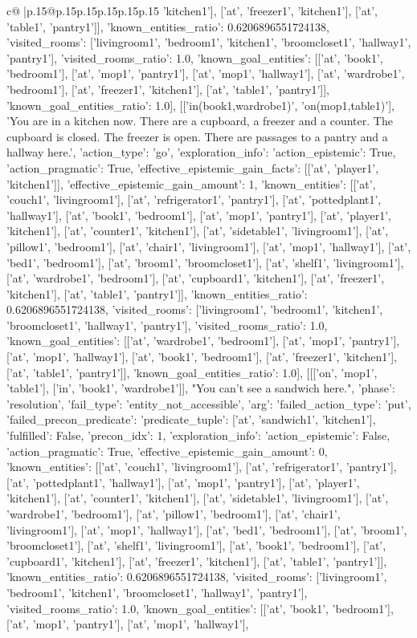 \documentclass{article}
\begin{document}
{\begin{supertabular}{c@{$\;$}|p{.15\linewidth}@{}p{.15\linewidth}p{.15\linewidth}p{.15\linewidth}p{.15\linewidth}p{.15\linewidth}}
{{{'kitchen1'], ['at', 'freezer1', 'kitchen1'], ['at', 'table1', 'pantry1']], 'known_entities_ratio': 0.6206896551724138, 'visited_rooms': ['livingroom1', 'bedroom1', 'kitchen1', 'broomcloset1', 'hallway1', 'pantry1'], 'visited_rooms_ratio': 1.0, 'known_goal_entities': [['at', 'book1', 'bedroom1'], ['at', 'mop1', 'pantry1'], ['at', 'mop1', 'hallway1'], ['at', 'wardrobe1', 'bedroom1'], ['at', 'freezer1', 'kitchen1'], ['at', 'table1', 'pantry1']], 'known_goal_entities_ratio': 1.0}}], [['in(book1,wardrobe1)', 'on(mop1,table1)'], 'You are in a kitchen now. There are a cupboard, a freezer and a counter. The cupboard is closed. The freezer is open. There are passages to a pantry and a hallway here.', {'action_type': 'go', 'exploration_info': {'action_epistemic': True, 'action_pragmatic': True, 'effective_epistemic_gain_facts': [['at', 'player1', 'kitchen1']], 'effective_epistemic_gain_amount': 1, 'known_entities': [['at', 'couch1', 'livingroom1'], ['at', 'refrigerator1', 'pantry1'], ['at', 'pottedplant1', 'hallway1'], ['at', 'book1', 'bedroom1'], ['at', 'mop1', 'pantry1'], ['at', 'player1', 'kitchen1'], ['at', 'counter1', 'kitchen1'], ['at', 'sidetable1', 'livingroom1'], ['at', 'pillow1', 'bedroom1'], ['at', 'chair1', 'livingroom1'], ['at', 'mop1', 'hallway1'], ['at', 'bed1', 'bedroom1'], ['at', 'broom1', 'broomcloset1'], ['at', 'shelf1', 'livingroom1'], ['at', 'wardrobe1', 'bedroom1'], ['at', 'cupboard1', 'kitchen1'], ['at', 'freezer1', 'kitchen1'], ['at', 'table1', 'pantry1']], 'known_entities_ratio': 0.6206896551724138, 'visited_rooms': ['livingroom1', 'bedroom1', 'kitchen1', 'broomcloset1', 'hallway1', 'pantry1'], 'visited_rooms_ratio': 1.0, 'known_goal_entities': [['at', 'wardrobe1', 'bedroom1'], ['at', 'mop1', 'pantry1'], ['at', 'mop1', 'hallway1'], ['at', 'book1', 'bedroom1'], ['at', 'freezer1', 'kitchen1'], ['at', 'table1', 'pantry1']], 'known_goal_entities_ratio': 1.0}}], [[['on', 'mop1', 'table1'], ['in', 'book1', 'wardrobe1']], "You can't see a sandwich here.", {'phase': 'resolution', 'fail_type': 'entity_not_accessible', 'arg': {'failed_action_type': 'put', 'failed_precon_predicate': {'predicate_tuple': ['at', 'sandwich1', 'kitchen1'], 'fulfilled': False, 'precon_idx': 1}}, 'exploration_info': {'action_epistemic': False, 'action_pragmatic': True, 'effective_epistemic_gain_amount': 0, 'known_entities': [['at', 'couch1', 'livingroom1'], ['at', 'refrigerator1', 'pantry1'], ['at', 'pottedplant1', 'hallway1'], ['at', 'mop1', 'pantry1'], ['at', 'player1', 'kitchen1'], ['at', 'counter1', 'kitchen1'], ['at', 'sidetable1', 'livingroom1'], ['at', 'wardrobe1', 'bedroom1'], ['at', 'pillow1', 'bedroom1'], ['at', 'chair1', 'livingroom1'], ['at', 'mop1', 'hallway1'], ['at', 'bed1', 'bedroom1'], ['at', 'broom1', 'broomcloset1'], ['at', 'shelf1', 'livingroom1'], ['at', 'book1', 'bedroom1'], ['at', 'cupboard1', 'kitchen1'], ['at', 'freezer1', 'kitchen1'], ['at', 'table1', 'pantry1']], 'known_entities_ratio': 0.6206896551724138, 'visited_rooms': ['livingroom1', 'bedroom1', 'kitchen1', 'broomcloset1', 'hallway1', 'pantry1'], 'visited_rooms_ratio': 1.0, 'known_goal_entities': [['at', 'book1', 'bedroom1'], ['at', 'mop1', 'pantry1'], ['at', 'mop1', 'hallway1'], }}}
\end{supertabular}}
\end{document}
